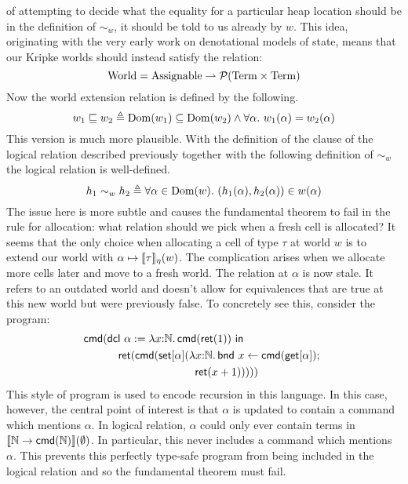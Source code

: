 of attempting to decide what the equality for a particular heap
location should be in the definition of $\sim_w$, it should be told to
us already by $w$. This idea, originating with the very early work on
denotational models of state, means that our Kripke worlds should
instead satisfy the relation:
\[
  \mathrm{World} = \mathrm{Assignable} \rightharpoonup \mathcal{P}(\mathrm{Term} \times \mathrm{Term})
\]
Now the world extension relation is defined by the following.
\[
  w_1 \mathrel{\sqsubseteq} w_2 \triangleq
  \operatorname{Dom}(w_1) \subseteq \operatorname{Dom}(w_2) \land
  \forall \alpha.\ w_1(\alpha) = w_2(\alpha)
\]
This version is much more plausible. With the definition of the clause
of the logical relation described previously together with the
following definition of $\sim_w$ the logical relation is well-defined.
\[
  h_1 \sim_w h_2 \triangleq \forall \alpha \in \operatorname{Dom}(w).
  \  (h_1(\alpha), h_2(\alpha)) \in w(\alpha)
\]
The issue here is more subtle and causes the fundamental theorem to
fail in the rule for allocation: what relation should we pick when a
fresh cell is allocated? It seems that the only choice when allocating
a cell of type $\tau$ at world $w$ is to extend our world with
$\alpha \mapsto \llbracket \tau \rrbracket_\eta(w)$. The complication arises when we
allocate more cells later and move to a fresh world. The relation at
$\alpha$ is now stale. It refers to an outdated world and doesn't
allow for equivalences that are true at this new world but were
previously false. To concretely see this, consider the program:
\begin{align*}
  \cmd{
    &\dcl{\alpha}{\lam{x}{\nat}{\cmd{\ret{1}}}}{\\
      &\quad \ret{\cmd{\set{\alpha}{\lam{x}{\nat}{
          \bnd{x}{\cmd{\get{\alpha}}}{\\ & \qquad\qquad\qquad\qquad\ret{x + 1}}
        }}}}
    }
  }
\end{align*}
This style of program is used to encode recursion in this language.
In this case, however, the central point of interest is that
$\alpha$ is updated to contain a command which mentions $\alpha$. In
logical relation, $\alpha$ could only ever contain terms in
$\llbracket \mathbb{N} \to \mathsf{cmd}(\mathbb{N}) \rrbracket(\emptyset)$. In particular, this never
includes a command which mentions $\alpha$. This prevents this
perfectly type-safe program from being included in the logical
relation and so the fundamental theorem must fail.

